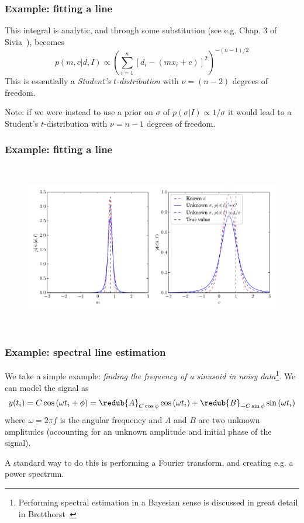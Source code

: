 \begin{frame}

\frametitle{Example: fitting a line}
\label{example:fittingaline}

This integral is analytic, and through some substitution (see e.g. Chap. 3 of Sivia~\citep{Sivia}), becomes
\[
p(m,c|d,I) \propto \left( \sum_{i=1}^n [d_i-(m x_i + c)]^2 \right)^{-(n-1)/2}
\]
This is essentially a \emph{Student's $t$-distribution} with $\nu = (n-2)$ degrees of freedom.

Note: if we were instead to use a prior on $\sigma$ of $p(\sigma|I) \propto 1/\sigma$ it would
lead to a Student's $t$-distribution with $\nu = n-1$ degrees of freedom.

\end{frame}

\begin{frame}

\frametitle{Example: fitting a line}
\label{example:fittingaline}

\begin{figure}[htbp]
\centering
\includegraphics[keepaspectratio,width=\textwidth,height=210pt]{figures/bayesian_line_fitting_2.pdf}
\label{bayesian_line_fitting_2}
\end{figure}

\end{frame}

\begin{frame}

\frametitle{Example: spectral line estimation}
\label{example:spectrallineestimation}

We take a simple example: \emph{finding the frequency of a sinusoid in noisy data}\footnote{Performing spectral estimation in a Bayesian sense is discussed in great detail in Bretthorst~\citep{Bretthorst}}. We can model the signal as
\[
y(t_i) = C\cos{(\omega t_i + \phi)} = \redub{A}_{C\cos{\phi}}\cos{(\omega t_i)} + \redub{B}_{-C\sin{\phi}}\sin{(\omega t_i)}
\]
where $\omega = 2\pi f$ is the angular frequency and $A$ and $B$ are two unknown amplitudes (accounting for an
unknown amplitude and initial phase of the signal).

A standard way to do this is performing a Fourier transform, and creating e.g. a power spectrum.

\end{frame}

